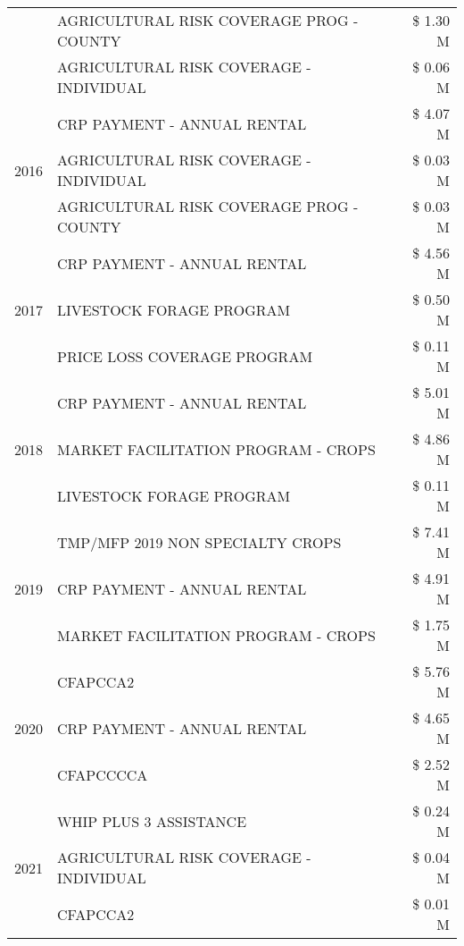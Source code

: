 \begin{tabular}{llr}
 & AGRICULTURAL RISK COVERAGE PROG - COUNTY & \$ 1.30 M \\
 & AGRICULTURAL RISK COVERAGE - INDIVIDUAL & \$ 0.06 M \\
\cline{1-3}
\multirow[t]{3}{*}{2016} & CRP PAYMENT - ANNUAL RENTAL & \$ 4.07 M \\
 & AGRICULTURAL RISK COVERAGE - INDIVIDUAL & \$ 0.03 M \\
 & AGRICULTURAL RISK COVERAGE PROG - COUNTY & \$ 0.03 M \\
\cline{1-3}
\multirow[t]{3}{*}{2017} & CRP PAYMENT - ANNUAL RENTAL & \$ 4.56 M \\
 & LIVESTOCK FORAGE PROGRAM & \$ 0.50 M \\
 & PRICE LOSS COVERAGE PROGRAM & \$ 0.11 M \\
\cline{1-3}
\multirow[t]{3}{*}{2018} & CRP PAYMENT - ANNUAL RENTAL & \$ 5.01 M \\
 & MARKET FACILITATION PROGRAM - CROPS & \$ 4.86 M \\
 & LIVESTOCK FORAGE PROGRAM & \$ 0.11 M \\
\cline{1-3}
\multirow[t]{3}{*}{2019} & TMP/MFP 2019 NON SPECIALTY CROPS & \$ 7.41 M \\
 & CRP PAYMENT - ANNUAL RENTAL & \$ 4.91 M \\
 & MARKET FACILITATION PROGRAM - CROPS & \$ 1.75 M \\
\cline{1-3}
\multirow[t]{3}{*}{2020} & CFAPCCA2 & \$ 5.76 M \\
 & CRP PAYMENT - ANNUAL RENTAL & \$ 4.65 M \\
 & CFAPCCCCA & \$ 2.52 M \\
\cline{1-3}
\multirow[t]{3}{*}{2021} & WHIP PLUS 3 ASSISTANCE & \$ 0.24 M \\
 & AGRICULTURAL RISK COVERAGE - INDIVIDUAL & \$ 0.04 M \\
 & CFAPCCA2 & \$ 0.01 M \\
\cline{1-3}
\bottomrule
\end{tabular}
